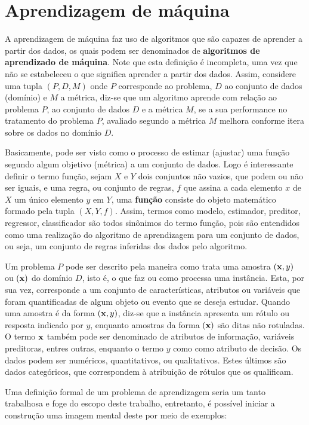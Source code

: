 \section{Aprendizagem de máquina}

A aprendizagem de máquina faz uso de algoritmos que são capazes de aprender a partir dos dados, os quais podem ser denominados de {\bf algoritmos de aprendizado de máquina}. Note que esta definição é incompleta, uma vez que não se estabeleceu o que significa aprender a partir dos dados. Assim, considere uma tupla $(P, D, M)$ onde $P$ corresponde ao problema, $D$ ao conjunto de dados (domínio) e $M$ a métrica, diz-se que um algoritmo aprende com relação ao problema $P$, ao conjunto de dados $D$ e a métrica $M$, se a sua performance no tratamento do problema $P$, avaliado segundo a métrica $M$ melhora conforme itera sobre os dados no domínio $D$.

Basicamente, pode ser visto como o processo de estimar (ajustar) uma função segundo algum objetivo (métrica) a um conjunto de dados. Logo é interessante definir o termo função, sejam $X$ e $Y$ dois conjuntos não vazios, que podem ou não ser iguais, e uma regra, ou conjunto de regras, $f$ que assina a cada elemento $x$ de $X$ um único elemento $y$ em $Y$, uma {\bf função} consiste do objeto matemático formado pela tupla $(X, Y, f)$. Assim, termos como modelo, estimador, preditor, regressor, classificador são todos sinônimos do termo função, pois são entendidos como uma realização do algoritmo de aprendizagem para um conjunto de dados, ou seja, um conjunto de regras inferidas dos dados pelo algoritmo.

Um problema $P$ pode ser descrito pela maneira como trata uma amostra $({\bf x}, y)$ ou $({\bf x})$ do domínio $D$, isto é, o que faz ou como processa uma instância. Esta, por sua vez, corresponde a um conjunto de características, atributos ou variáveis que foram quantificadas de algum objeto ou evento que se deseja estudar. Quando uma amostra é da forma $({\bf x}, y)$, diz-se que a instância apresenta um rótulo ou resposta indicado por $y$, enquanto amostras da forma $({\bf x})$ são ditas não rotuladas. O termo ${\bf x}$ também pode ser denominado de atributos de informação, variáveis preditoras, entres outras, enquanto o termo $y$ como como atributo de decisão. Os dados podem ser numéricos, quantitativos, ou qualitativos. Estes últimos são dados categóricos, que correspondem à atribuição de rótulos que os qualificam.

Uma definição formal de um problema de aprendizagem seria um tanto trabalhosa e foge do escopo deste trabalho, entretanto, é possível iniciar a construção uma imagem mental deste por meio de exemplos:

